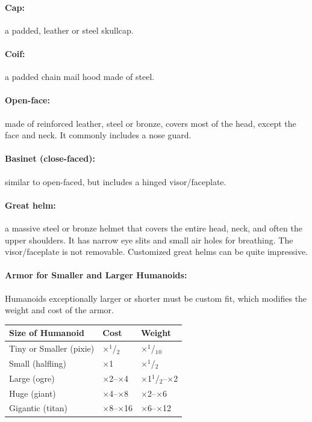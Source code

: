 \begin{multicols}{2}
\paragraph{Cap:} a padded, leather or steel skullcap.

\paragraph{Coif:} a padded chain mail hood made of steel.

\paragraph{Open-face:} made of reinforced leather, steel or bronze, covers most of the head, except the face and neck.  It commonly includes a nose guard.

\paragraph{Basinet (close-faced):} similar to open-faced, but includes a hinged visor/faceplate.

\paragraph{Great helm:} a massive steel or bronze helmet that covers the entire head, neck, and often the upper shoulders.  It has narrow eye slits and small air holes for breathing.  The visor/faceplate is not removable.  Customized great helms can be quite impressive. 

\paragraph{Armor for Smaller and Larger Humanoids:} Humanoids exceptionally larger or shorter must be custom fit, which modifies the weight and cost of the armor.  

\noindent
\begin{minipage}{\columnwidth}

\label{smallerlarger}
\noindent
\begin{tabular}{|p{}|p{}|p{}|}
\hline
Size of Humanoid		& Cost			& Weight \\
\hline\hline
\rowcolor[gray]{.9}Tiny or Smaller (pixie)	& $\times$$^1$/$_2$	& $\times$$^1$/$_1$$_0$ \\
Small (halfling)		& $\times$1			& $\times$$^1$/$_2$ \\
\rowcolor[gray]{.9}Large (ogre)			& $\times$2--$\times$4		& $\times$1$^1$/$_2$--$\times$2 \\
Huge (giant)			& $\times$4--$\times$8		& $\times$2--$\times$6 \\
\rowcolor[gray]{.9}Gigantic (titan)		& $\times$8--$\times$16	& $\times$6--$\times$12 \\
\hline
\end{tabular}


\end{minipage}
\end{multicols}
